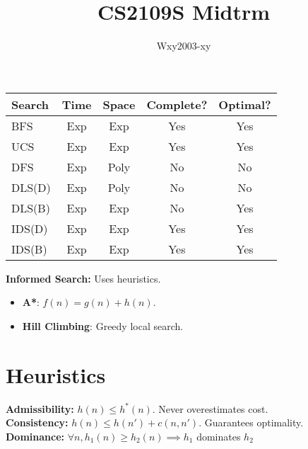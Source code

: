 \documentclass[twocolumn, 10pt]{article}
\begin{document}
\title{CS2109S Midtrm}
\author{Wxy2003-xy}
\date{}
\maketitle
\begin{tabular}{|l|c|c|c|c|}
    \hline
    \textbf{Search} & \textbf{Time} & \textbf{Space} & \textbf{Complete?} & \textbf{Optimal?} \\
    \hline
    BFS  & Exp & Exp  & Yes  & Yes  \\
    UCS  & Exp & Exp  & Yes  & Yes  \\
    DFS  & Exp & Poly & No   & No   \\
    DLS(D)  & Exp & Poly & No   & No   \\
    DLS(B)  & Exp & Exp & No   & Yes   \\
    IDS(D)  & Exp & Exp  & Yes  & Yes  \\
    IDS(B)  & Exp & Exp  & Yes  & Yes  \\
    \hline
\end{tabular}
\newline
\textbf{Informed Search:} Uses heuristics.
\begin{itemize}
    \item \textbf{A*}: $f(n) = g(n) + h(n)$.
    \item \textbf{Hill Climbing}: Greedy local search.
\end{itemize}

\section*{Heuristics}
\textbf{Admissibility:} $h(n) \leq h^*(n)$. Never overestimates cost.\\
\textbf{Consistency:} $h(n) \leq h(n') + c(n, n')$. Guarantees optimality.\\
\textbf{Dominance:} $\forall n, h_1(n) \geq h_2(n) \implies h_1$ dominates $h_2$
\end{document}

